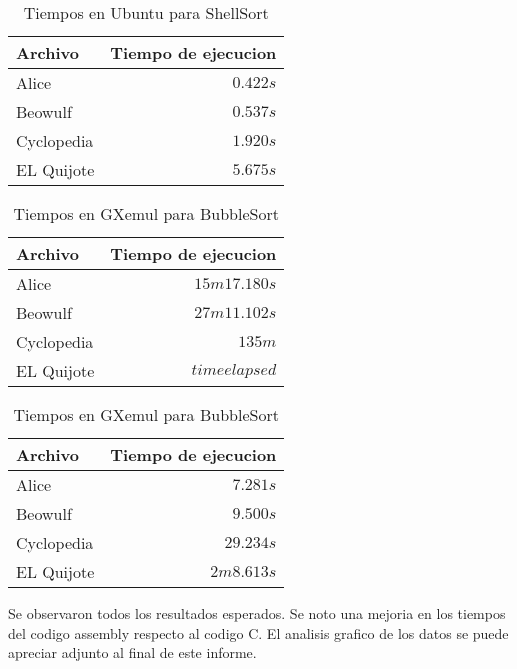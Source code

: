 \documentclass[a4paper,11pt]{article}
\begin{document}
\FloatBarrier

\begin{table}[h!t]
\centering
\begin{tabular}{ | l | r | }
  \hline
  Archivo          & Tiempo de ejecucion \\ \hline
  Alice				 & \(0.422s\) \\
  Beowulf     & \(0.537s\) \\
  Cyclopedia     & \(1.920s\) \\
  EL Quijote      & \(5.675s\) \\
  \hline
\end{tabular}
\caption{Tiempos en Ubuntu para ShellSort}
\label{tab:resultados}
\end{table}

\FloatBarrier

\begin{table}[h!t]
\centering
\begin{tabular}{ | l | r | }
  \hline
  Archivo          & Tiempo de ejecucion \\ \hline
  Alice				 & \(15m 17.180s\) \\
  Beowulf     & \(27m 11.102s\) \\
  Cyclopedia     & \(135m\) \\
  EL Quijote      & \(time elapsed\) \\
  \hline
\end{tabular}

\caption{Tiempos en GXemul para BubbleSort}
\label{tab:resultados}
\end{table}

\FloatBarrier

\begin{table}[h!t]
\centering
\begin{tabular}{ | l | r | }
  \hline
  Archivo          & Tiempo de ejecucion \\ \hline
  Alice				 & \(7.281s\) \\
  Beowulf     & \(9.500s\) \\
  Cyclopedia     & \(29.234s\) \\
  EL Quijote      & \(2m 8.613s\) \\
  \hline
\end{tabular}
\caption{Tiempos en GXemul para BubbleSort}
\label{tab:resultados}
\end{table}

\FloatBarrier

Se observaron todos los resultados esperados. Se noto una mejoria en los tiempos del codigo assembly respecto al codigo C. El analisis grafico de los datos se puede apreciar adjunto al final de este informe.
\end{document}
